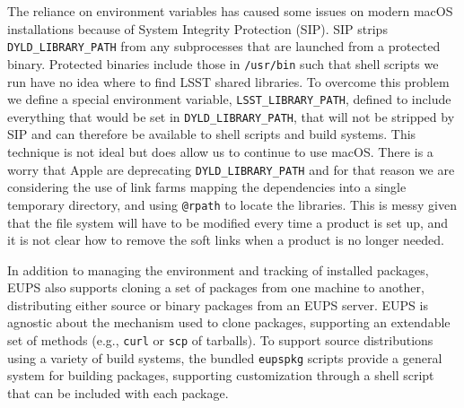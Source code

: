 The reliance on environment variables has caused some issues on modern macOS installations because of System Integrity Protection (SIP).\cite{DMTN-001}
SIP strips \texttt{DYLD\_LIBRARY\_PATH} from any subprocesses that are launched from a protected binary.
Protected binaries include those in \texttt{/usr/bin} such that shell scripts we run have no idea where to find LSST shared libraries.
To overcome this problem we define a special environment variable, \texttt{LSST\_LIBRARY\_PATH}, defined to include everything that would be set in \texttt{DYLD\_LIBRARY\_PATH}, that will not be stripped by SIP and can therefore be available to shell scripts and build systems.
This technique is not ideal but does allow us to continue to use macOS.
There is a worry that Apple are deprecating \texttt{DYLD\_LIBRARY\_PATH} and for that reason we are considering the use of link farms mapping the dependencies into a single temporary directory, and using \texttt{@rpath} to locate the libraries.
This is messy given that the file system will have to be modified every time a product is set up, and it is not clear how to remove the soft links when a product is no longer needed.

In addition to managing the environment and tracking of installed packages, EUPS also supports cloning a set of packages from one machine to another, distributing either source or binary packages from an EUPS server.
EUPS is agnostic about the mechanism used to clone packages, supporting an extendable set of methods (e.g., \texttt{curl} or \texttt{scp} of tarballs).
To support source distributions using a variety of build systems, the bundled \texttt{eupspkg} scripts provide a general system for building packages, supporting customization through a shell script that can be included with each package.
